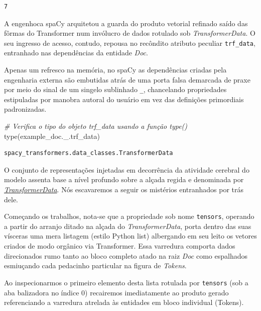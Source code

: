 \documentclass[
  brazilian,
]{article}
\newenvironment{Shaded}{}{}
\newcommand{\BuiltInTok}[1]{#1}
\newcommand{\CommentTok}[1]{\textcolor[rgb]{0.38,0.63,0.69}{\textit{#1}}}
\newcommand{\NormalTok}[1]{#1}
\begin{document}
\begin{verbatim}
7
\end{verbatim}

A engenhoca spaCy arquitetou a guarda do produto vetorial refinado saído
das fôrmas do Transformer num invólucro de dados rotulado sob
\emph{TransformerData}. O seu ingresso de acesso, contudo, repousa no
recôndito atributo peculiar \texttt{trf\_data}, entranhado nas
dependências da entidade \emph{Doc}.

Apenas um refresco na memória, no spaCy as dependências criadas pela
engenharia externa são embutidas atrás de uma porta falsa demarcada de
praxe por meio do sinal de um singelo sublinhado \texttt{\_},
chancelando propriedades estipuladas por manobra autoral do usuário em
vez das definições primordiais padronizadas.

\begin{Shaded}
\begin{Highlighting}[]
\CommentTok{\# Verifica o tipo do objeto \textquotesingle{}trf\_data\textquotesingle{} usando a função type()}
\BuiltInTok{type}\NormalTok{(example\_doc.\_.trf\_data)}
\end{Highlighting}
\end{Shaded}

\begin{verbatim}
spacy_transformers.data_classes.TransformerData
\end{verbatim}

O conjunto de representações injetadas em decorrência da atividade
cerebral do modelo assenta base a nível profundo sobre a alçada regida e
denominada por
\emph{\href{https://spacy.io/api/transformer\#transformerdata}{TransformerData}}.
Nós escavaremos a seguir os mistérios entranhados por trás dele.

Começando os trabalhos, nota-se que a propriedade sob nome
\texttt{tensors}, operando a partir do arranjo ditado na alçada do
\emph{TransformerData}, porta dentro das suas vísceras uma mera listagem
(estilo Python list) albergando em seu leito os vetores criados de modo
orgânico via Transformer. Essa varredura comporta dados direcionados
rumo tanto ao bloco completo atado na raiz \emph{Doc} como espalhados
esmiuçando cada pedacinho particular na figura de \emph{Tokens}.

Ao inspecionarmos o primeiro elemento desta lista rotulada por
\texttt{tensors} (sob a aba balizadora no índice 0) recairemos
imediatamente ao produto gerado referenciando a varredura atrelada às
entidades em bloco individual (Tokens).
\end{document}
